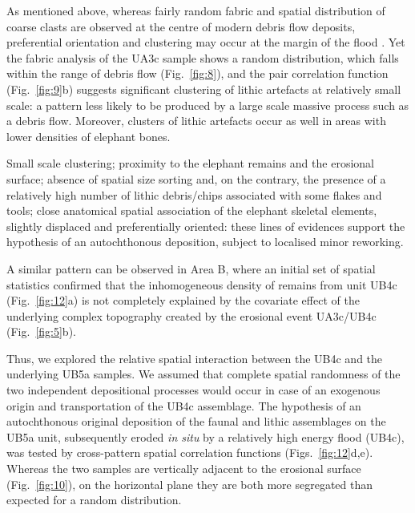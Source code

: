 \documentclass[preprint,authoryear,times]{elsarticle} %
\begin{document}
As mentioned above, whereas fairly random fabric and spatial distribution of coarse clasts are observed at the centre of modern debris flow deposits, preferential orientation and clustering may occur at the margin of the flood \citep{Pierson2005}. Yet the fabric analysis of the UA3c sample shows a random distribution, which falls within the range of debris flow (Fig.~\ref{fig:8}), and the pair correlation function (Fig.~\ref{fig:9}b) suggests significant clustering of lithic artefacts at relatively small scale: a pattern less likely to be produced by a large scale massive process such as a debris flow. Moreover, clusters of lithic artefacts occur as well in areas with lower densities of elephant bones.

Small scale clustering; proximity to the elephant remains and the erosional surface; absence of spatial size sorting and, on the contrary, the presence of a relatively high number of lithic debris/chips associated with some flakes and tools; close anatomical spatial association of the elephant skeletal elements, slightly displaced and preferentially oriented: these lines of evidences support the hypothesis of an autochthonous deposition, subject to localised minor reworking.


A similar pattern can be observed in Area B, where an initial set of spatial statistics confirmed that the inhomogeneous density of remains from unit UB4c (Fig.~\ref{fig:12}a) is not completely explained by the covariate effect of the underlying complex topography created by the erosional event UA3c/UB4c (Fig.~\ref{fig:5}b).

Thus, we explored the relative spatial interaction between the UB4c and the underlying UB5a samples. We assumed that complete spatial randomness of the two independent depositional processes would occur in case of an exogenous origin and transportation of the UB4c assemblage. The hypothesis of an autochthonous original deposition of the faunal and lithic assemblages on the UB5a unit, subsequently eroded \emph{in situ} by a relatively high energy flood (UB4c), was tested by cross-pattern spatial correlation functions (Figs.~\ref{fig:12}d,e). Whereas the two samples are vertically adjacent to the erosional surface (Fig.~\ref{fig:10}), on the horizontal plane they are both more segregated than expected for a random distribution.
\end{document}
